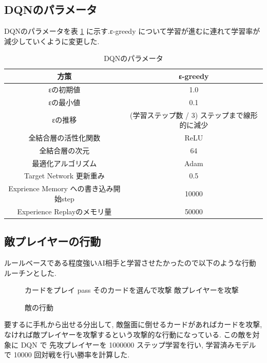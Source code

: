 \documentclass{jarticle}     %
\begin{document}
\subsection{DQNのパラメータ}
DQNのパラメータを表 \ref{table:updateparam} に示す.ε-greedy について学習が進むに連れて学習率が減少していくように変更した.
\begin{table}[H]
  \centering
  \caption{DQNのパラメータ}
  \label{table:updateparam}
  \begin{tabular}{|c||c|}
  \hline
  方策                 & ε-greedy \\ \hline
  εの初期値                      & 1.0      \\ \hline
  εの最小値                      & 0.1      \\ \hline
  εの推移                      & (学習ステップ数 / 3) ステップまで線形的に減少      \\ \hline       
  全結合層の活性化関数             & ReLU     \\ \hline
  全結合層の次元                & 64       \\ \hline
  最適化アルゴリズム              & Adam     \\ \hline
  Target Network 更新重み              & 0.5     \\ \hline
  Exprience Memory への書き込み開始step & 10000 \\ \hline
  Experience Replayのメモリ量 & 50000  \\ \hline
  \end{tabular}
  \end{table}
\subsection{敵プレイヤーの行動}
ルールベースである程度強いAI相手と学習させたかったので以下のような行動ルーチンとした.

\begin{figure}[H]
  \begin{algorithm}[H]
      \caption{敵の行動}
      \label{alg1}
      \begin{algorithmic}[1] 
      \STATE カードをプレイ
      \ELSE
      \STATE pass
      \ENDIF
      \ENDFOR
      \STATE そのカードを選んで攻撃
      \ELSE
      \STATE 敵プレイヤーを攻撃
      \ENDIF
      \ENDFOR
      \end{algorithmic}
  \end{algorithm}
  \end{figure}
要するに手札から出せる分出して, 敵盤面に倒せるカードがあればカードを攻撃, なければ敵プレイヤーを攻撃するという攻撃的な行動になっている.
この敵を対象に DQN で 先攻プレイヤーを 1000000 ステップ学習を行い, 学習済みモデルで 10000 回対戦を行い勝率を計算した.
\end{document}
